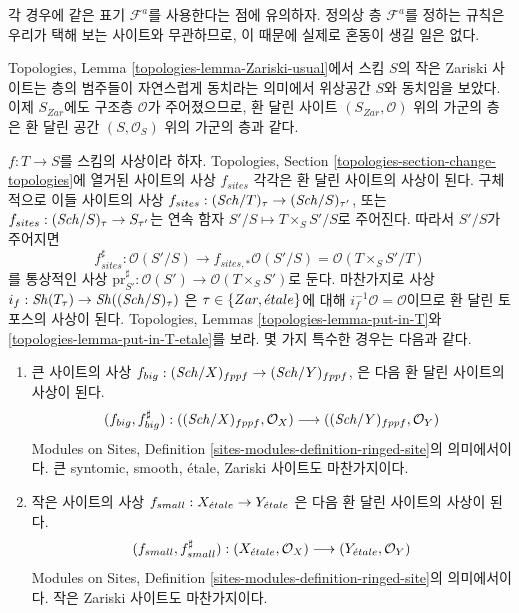 \noindent
각 경우에 같은 표기 $\mathcal{F}^a$를 사용한다는 점에 유의하자.
정의상 층 $\mathcal{F}^a$를 정하는 규칙은 우리가 택해 보는 사이트와
무관하므로, 이 때문에 실제로 혼동이 생길 일은 없다.

\begin{remark}
\label{remark-Zariski-site-space}
Topologies, Lemma \ref{topologies-lemma-Zariski-usual}에서 스킴 $S$의
작은 Zariski 사이트는 층의 범주들이 자연스럽게 동치라는 의미에서
위상공간 $S$와 동치임을 보았다. 이제 $S_{Zar}$에도 구조층
$\mathcal{O}$가 주어졌으므로, 환 달린 사이트 $(S_{Zar}, \mathcal{O})$
위의 가군의 층은 환 달린 공간 $(S, \mathcal{O}_S)$ 위의 가군의 층과 같다.
\end{remark}

\begin{remark}
\label{remark-change-topologies-ringed}
$f : T \to S$를 스킴의 사상이라 하자.
Topologies, Section \ref{topologies-section-change-topologies}에 열거된
사이트의 사상 $f_{sites}$ 각각은 환 달린 사이트의 사상이 된다.
구체적으로 이들 사이트의 사상
$f_{sites} : (\mathit{Sch}/T)_\tau \to (\mathit{Sch}/S)_{\tau'}$, 또는
$f_{sites} : (\mathit{Sch}/S)_\tau \to S_{\tau'}$는 연속 함자
$S'/S \mapsto T \times_S S'/S$로 주어진다. 따라서 $S'/S$가 주어지면
$$
f_{sites}^\sharp :
\mathcal{O}(S'/S)
\longrightarrow
f_{sites, *}\mathcal{O}(S'/S) =
\mathcal{O}(T \times_S S'/T)
$$
를 통상적인 사상
$\text{pr}_{S'}^\sharp : \mathcal{O}(S') \to \mathcal{O}(T \times_S S')$로 둔다.
마찬가지로 사상
$i_f : \mathop{\mathit{Sh}}\nolimits(T_\tau) \to \mathop{\mathit{Sh}}\nolimits((\mathit{Sch}/S)_\tau)$
은 $\tau \in \{Zar, {\acute{e}tale}\}$에 대해 $i_f^{-1}\mathcal{O} = \mathcal{O}$이므로
환 달린 토포스의 사상이 된다. Topologies, Lemmas
\ref{topologies-lemma-put-in-T}와
\ref{topologies-lemma-put-in-T-etale}를 보라. 몇 가지 특수한 경우는 다음과 같다.
\begin{enumerate}
\item 큰 사이트의 사상
$f_{big} : (\mathit{Sch}/X)_{fppf} \to (\mathit{Sch}/Y)_{fppf}$,
은 다음 환 달린 사이트의 사상이 된다.
$$
(f_{big}, f_{big}^\sharp) :
((\mathit{Sch}/X)_{fppf}, \mathcal{O}_X)
\longrightarrow
((\mathit{Sch}/Y)_{fppf}, \mathcal{O}_Y)
$$
Modules on Sites, Definition \ref{sites-modules-definition-ringed-site}의
의미에서이다. 큰 syntomic, smooth, \'etale, Zariski 사이트도 마찬가지이다.
\item 작은 사이트의 사상
$f_{small} : X_{\acute{e}tale} \to Y_{\acute{e}tale}$
은 다음 환 달린 사이트의 사상이 된다.
$$
(f_{small}, f_{small}^\sharp) :
(X_{\acute{e}tale}, \mathcal{O}_X)
\longrightarrow
(Y_{\acute{e}tale}, \mathcal{O}_Y)
$$
Modules on Sites, Definition \ref{sites-modules-definition-ringed-site}의
의미에서이다. 작은 Zariski 사이트도 마찬가지이다.
\end{enumerate}
\end{remark}

